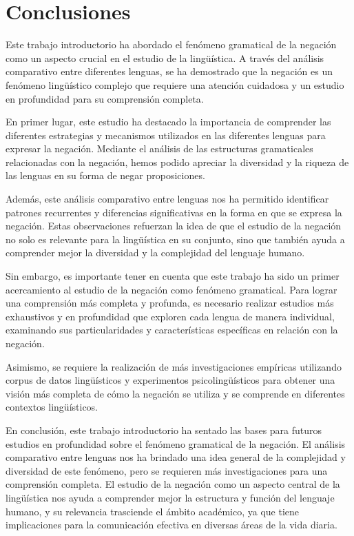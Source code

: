 \section*{Conclusiones}

\noindent Este trabajo introductorio ha abordado el fenómeno gramatical de la negación como un aspecto crucial en el estudio de la lingüística. A través del análisis comparativo entre diferentes lenguas, se ha demostrado que la negación es un fenómeno lingüístico complejo que requiere una atención cuidadosa y un estudio en profundidad para su comprensión completa.

En primer lugar, este estudio ha destacado la importancia de comprender las diferentes estrategias y mecanismos utilizados en las diferentes lenguas para expresar la negación. Mediante el análisis de las estructuras gramaticales relacionadas con la negación, hemos podido apreciar la diversidad y la riqueza de las lenguas en su forma de negar proposiciones.

Además, este análisis comparativo entre lenguas nos ha permitido identificar patrones recurrentes y diferencias significativas en la forma en que se expresa la negación. Estas observaciones refuerzan la idea de que el estudio de la negación no solo es relevante para la lingüística en su conjunto, sino que también ayuda a comprender mejor la diversidad y la complejidad del lenguaje humano.

Sin embargo, es importante tener en cuenta que este trabajo ha sido un primer acercamiento al estudio de la negación como fenómeno gramatical. Para lograr una comprensión más completa y profunda, es necesario realizar estudios más exhaustivos y en profundidad que exploren cada lengua de manera individual, examinando sus particularidades y características específicas en relación con la negación.

Asimismo, se requiere la realización de más investigaciones empíricas utilizando corpus de datos lingüísticos y experimentos psicolingüísticos para obtener una visión más completa de cómo la negación se utiliza y se comprende en diferentes contextos lingüísticos.

En conclusión, este trabajo introductorio ha sentado las bases para futuros estudios en profundidad sobre el fenómeno gramatical de la negación. El análisis comparativo entre lenguas nos ha brindado una idea general de la complejidad y diversidad de este fenómeno, pero se requieren más investigaciones para una comprensión completa. El estudio de la negación como un aspecto central de la lingüística nos ayuda a comprender mejor la estructura y función del lenguaje humano, y su relevancia trasciende el ámbito académico, ya que tiene implicaciones para la comunicación efectiva en diversas áreas de la vida diaria.
